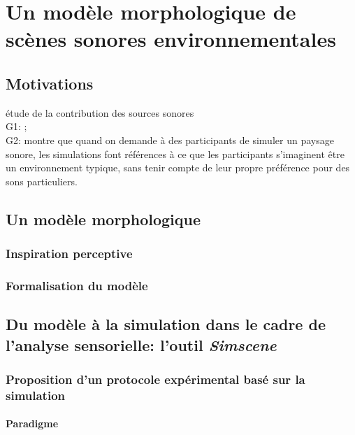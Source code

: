 \chapter{Un modèle morphologique de scènes sonores environnementales}\label{ch:psycho_model} %

\section{Motivations}

étude de la contribution des sources sonores \\

G1: \citep{bruce2009development,bruce2014effects}; \\
G2: \citep{davies2014soundscape} montre que quand on demande à des participants de simuler un paysage sonore, les simulations font références à ce que les participants s'imaginent être un environnement typique, sans tenir compte de leur propre préférence pour des sons particuliers.

\section{Un modèle morphologique}

\subsection{Inspiration perceptive}

\subsection{Formalisation du modèle}

\section{Du modèle à la simulation dans le cadre de l'analyse sensorielle: l'outil \emph{Simscene}}

\subsection{Proposition d'un protocole expérimental basé sur la simulation}

\subsubsection{Paradigme}

